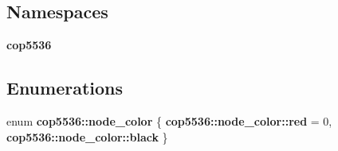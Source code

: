 \subsection*{Namespaces}
\begin{DoxyCompactItemize}
\item 
 \textbf{ cop5536}
\end{DoxyCompactItemize}
\subsection*{Enumerations}
\begin{DoxyCompactItemize}
\item 
enum \textbf{ cop5536\+::node\+\_\+color} \{ \textbf{ cop5536\+::node\+\_\+color\+::red} = 0, 
\textbf{ cop5536\+::node\+\_\+color\+::black}
 \}
\end{DoxyCompactItemize}
